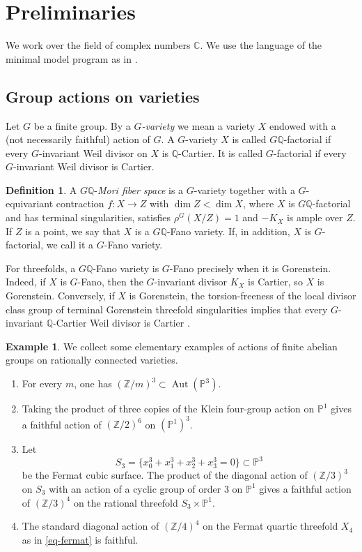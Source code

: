 \documentclass[10pt,oneside,reqno]{amsart}
\numberwithin{equation}{section}
\theoremstyle{definition}
\newtheorem{definition}[theorem]{Definition}
\newtheorem{example}[theorem]{Example}
\newcommand{\Z}{\mathbb Z}
\newcommand{\Q}{\mathbb Q}
\newcommand{\PP}{\mathbb P}
\begin{document}
\section{Preliminaries}
\label{sec-preliminaries}
We work over the field of complex numbers $\mathbb{C}$. 
We use the language of the minimal model program as in
\cite{KollarMori}.

\subsection{Group actions on varieties}
Let $G$ be a finite group. 
By a \emph{$G$-variety} we mean a variety
$X$ endowed with a (not necessarily faithful) action of $G$.
A $G$-variety $X$ is called $G\mathbb{Q}$-factorial if every
$G$-invariant Weil divisor on $X$ is $\mathbb{Q}$-Cartier. It is called
$G$-factorial if every $G$-invariant Weil divisor is Cartier.  
\begin{definition}
A
$G\mathbb{Q}$-\emph{Mori fiber space} is a $G$-variety together with a $G$-equivariant contraction
$f\colon X\to Z$ with $\dim Z<\dim X$, where $X$ is
$G\mathbb{Q}$-factorial and has terminal singularities, satisfies $\rho^G(X/Z)=1$ and $-K_X$ is ample over
$Z$.  If $Z$ is a point, we say that $X$ is a
$G\mathbb{Q}$-Fano variety.    If, in
addition, $X$ is $G$-factorial, we call it a $G$-Fano variety.
\end{definition}

For threefolds, a $G\Q$-Fano variety is $G$-Fano precisely when it is
Gorenstein.  Indeed, if $X$ is $G$-Fano, then the $G$-invariant divisor
$K_X$ is Cartier, so $X$ is Gorenstein.  Conversely, if $X$ is
Gorenstein, the torsion-freeness of the local divisor class group of
terminal Gorenstein threefold singularities implies that every
$G$-invariant $\Q$-Cartier Weil divisor is Cartier
\cite[Lemma~5.1]{Kawamata88}.

\begin{example}
\label{ex-standard-actions}
We collect some elementary examples of actions of finite abelian groups on rationally connected varieties. 
\begin{enumerate}
\item
For every $m$, one has
$(\Z/m)^3\subset\operatorname{Aut}(\PP^3)$.
\item
Taking the product of three copies of the Klein four-group action on
$\mathbb{P}^1$ gives a faithful action of $(\Z/2)^6$ on $(\PP^1)^3$.
\item
Let
\[
 S_3=\{x_0^3+x_1^3+x_2^3+x_3^3=0\}\subset\PP^3
\]
be the Fermat cubic surface.  The product of the diagonal action of
$(\Z/3)^3$ on $S_3$ with an action of a cyclic group of order $3$ on $\PP^1$ gives a faithful
action of $(\Z/3)^4$ on the rational threefold $S_3\times\PP^1$.
\item
The standard diagonal action of $(\Z/4)^4$ on the Fermat quartic
threefold $X_4$ as in \eqref{eq-fermat} is faithful.
\end{enumerate}
\end{example}
\end{document}
